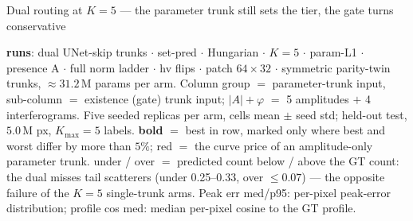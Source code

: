 \begin{frame}{Dual routing at $K{=}5$ --- the parameter trunk still sets the tier, the gate turns conservative}
  \par\vspace{3pt}
  \parbox{0.82\textwidth}{\tiny\color{soft} \textbf{runs}: dual UNet-skip trunks $\cdot$ set-pred $\cdot$ Hungarian $\cdot$ $K{=}5$ $\cdot$ param-L1 $\cdot$ presence A $\cdot$ full norm ladder $\cdot$ hv flips $\cdot$ patch $64{\times}32$ $\cdot$ symmetric parity-twin trunks, ${\approx}31.2$\,M params per arm. Column group $=$ parameter-trunk input, sub-column $=$ existence (gate) trunk input; $|A|{+}\varphi$ $=$ 5 amplitudes $+$ 4 interferograms. Five seeded replicas per arm, cells mean $\pm$ seed std; held-out test, $5.0$\,M px, $K_{\max}{=}5$ labels. \textbf{bold} $=$ best in row, marked only where best and worst differ by more than $5\%$; \textcolor{accent}{red} $=$ the curve price of an amplitude-only parameter trunk. under / over $=$ predicted count below / above the GT count: the dual misses tail scatterers (under 0.25--0.33, over ${\leq}0.07$) --- the opposite failure of the $K{=}5$ single-trunk arms. Peak err med/p95: per-pixel peak-error distribution; profile cos med: median per-pixel cosine to the GT profile.\par}
\end{frame}

